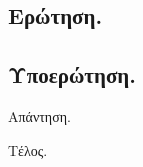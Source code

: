 \documentclass[10pt,landscape]{article}
\begin{document}
\renewcommand{\thesubsection}{{}(\alph{subsection})}

\renewcommand{\textdexiakeraia}{}

\addto\captionsgreek{
    \renewcommand{\bibname}{Βιβλιογραφία}
    \renewcommand{\refname}{Βιβλιογραφία}
}

\begin{multicols}{3}

\section{Ερώτηση.}

\subsection{Υποερώτηση.}

Απάντηση.



Τέλος.

\end{multicols}


%
%
%




\end{document}
